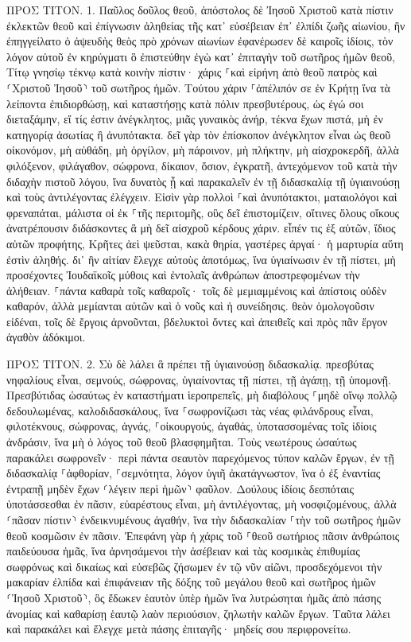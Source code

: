 \documentclass[twoside, 9pt]{extreport}
\begin{document}
ΠΡΟΣ ΤΙΤΟΝ.
1.
Παῦλος δοῦλος θεοῦ, ἀπόστολος δὲ Ἰησοῦ Χριστοῦ κατὰ πίστιν ἐκλεκτῶν θεοῦ καὶ ἐπίγνωσιν ἀληθείας τῆς κατ᾽ εὐσέβειαν 
ἐπ᾽ ἐλπίδι ζωῆς αἰωνίου, ἣν ἐπηγγείλατο ὁ ἀψευδὴς θεὸς πρὸ χρόνων αἰωνίων 
ἐφανέρωσεν δὲ καιροῖς ἰδίοις, τὸν λόγον αὐτοῦ ἐν κηρύγματι ὃ ἐπιστεύθην ἐγὼ κατ᾽ ἐπιταγὴν τοῦ σωτῆρος ἡμῶν θεοῦ, 
Τίτῳ γνησίῳ τέκνῳ κατὰ κοινὴν πίστιν· χάρις ⸀καὶ εἰρήνη ἀπὸ θεοῦ πατρὸς καὶ ⸂Χριστοῦ Ἰησοῦ⸃ τοῦ σωτῆρος ἡμῶν. 
Τούτου χάριν ⸀ἀπέλιπόν σε ἐν Κρήτῃ ἵνα τὰ λείποντα ἐπιδιορθώσῃ, καὶ καταστήσῃς κατὰ πόλιν πρεσβυτέρους, ὡς ἐγώ σοι διεταξάμην, 
εἴ τίς ἐστιν ἀνέγκλητος, μιᾶς γυναικὸς ἀνήρ, τέκνα ἔχων πιστά, μὴ ἐν κατηγορίᾳ ἀσωτίας ἢ ἀνυπότακτα. 
δεῖ γὰρ τὸν ἐπίσκοπον ἀνέγκλητον εἶναι ὡς θεοῦ οἰκονόμον, μὴ αὐθάδη, μὴ ὀργίλον, μὴ πάροινον, μὴ πλήκτην, μὴ αἰσχροκερδῆ, 
ἀλλὰ φιλόξενον, φιλάγαθον, σώφρονα, δίκαιον, ὅσιον, ἐγκρατῆ, 
ἀντεχόμενον τοῦ κατὰ τὴν διδαχὴν πιστοῦ λόγου, ἵνα δυνατὸς ᾖ καὶ παρακαλεῖν ἐν τῇ διδασκαλίᾳ τῇ ὑγιαινούσῃ καὶ τοὺς ἀντιλέγοντας ἐλέγχειν. 
Εἰσὶν γὰρ πολλοὶ ⸀καὶ ἀνυπότακτοι, ματαιολόγοι καὶ φρεναπάται, μάλιστα οἱ ἐκ ⸀τῆς περιτομῆς, 
οὓς δεῖ ἐπιστομίζειν, οἵτινες ὅλους οἴκους ἀνατρέπουσιν διδάσκοντες ἃ μὴ δεῖ αἰσχροῦ κέρδους χάριν. 
εἶπέν τις ἐξ αὐτῶν, ἴδιος αὐτῶν προφήτης, Κρῆτες ἀεὶ ψεῦσται, κακὰ θηρία, γαστέρες ἀργαί· 
ἡ μαρτυρία αὕτη ἐστὶν ἀληθής. δι᾽ ἣν αἰτίαν ἔλεγχε αὐτοὺς ἀποτόμως, ἵνα ὑγιαίνωσιν ἐν τῇ πίστει, 
μὴ προσέχοντες Ἰουδαϊκοῖς μύθοις καὶ ἐντολαῖς ἀνθρώπων ἀποστρεφομένων τὴν ἀλήθειαν. 
⸀πάντα καθαρὰ τοῖς καθαροῖς· τοῖς δὲ μεμιαμμένοις καὶ ἀπίστοις οὐδὲν καθαρόν, ἀλλὰ μεμίανται αὐτῶν καὶ ὁ νοῦς καὶ ἡ συνείδησις. 
θεὸν ὁμολογοῦσιν εἰδέναι, τοῖς δὲ ἔργοις ἀρνοῦνται, βδελυκτοὶ ὄντες καὶ ἀπειθεῖς καὶ πρὸς πᾶν ἔργον ἀγαθὸν ἀδόκιμοι. 

ΠΡΟΣ ΤΙΤΟΝ.
2.
Σὺ δὲ λάλει ἃ πρέπει τῇ ὑγιαινούσῃ διδασκαλίᾳ. 
πρεσβύτας νηφαλίους εἶναι, σεμνούς, σώφρονας, ὑγιαίνοντας τῇ πίστει, τῇ ἀγάπῃ, τῇ ὑπομονῇ. 
Πρεσβύτιδας ὡσαύτως ἐν καταστήματι ἱεροπρεπεῖς, μὴ διαβόλους ⸀μηδὲ οἴνῳ πολλῷ δεδουλωμένας, καλοδιδασκάλους, 
ἵνα ⸀σωφρονίζωσι τὰς νέας φιλάνδρους εἶναι, φιλοτέκνους, 
σώφρονας, ἁγνάς, ⸀οἰκουργούς, ἀγαθάς, ὑποτασσομένας τοῖς ἰδίοις ἀνδράσιν, ἵνα μὴ ὁ λόγος τοῦ θεοῦ βλασφημῆται. 
Τοὺς νεωτέρους ὡσαύτως παρακάλει σωφρονεῖν· 
περὶ πάντα σεαυτὸν παρεχόμενος τύπον καλῶν ἔργων, ἐν τῇ διδασκαλίᾳ ⸀ἀφθορίαν, ⸀σεμνότητα, 
λόγον ὑγιῆ ἀκατάγνωστον, ἵνα ὁ ἐξ ἐναντίας ἐντραπῇ μηδὲν ἔχων ⸂λέγειν περὶ ἡμῶν⸃ φαῦλον. 
Δούλους ἰδίοις δεσπόταις ὑποτάσσεσθαι ἐν πᾶσιν, εὐαρέστους εἶναι, μὴ ἀντιλέγοντας, 
μὴ νοσφιζομένους, ἀλλὰ ⸂πᾶσαν πίστιν⸃ ἐνδεικνυμένους ἀγαθήν, ἵνα τὴν διδασκαλίαν ⸀τὴν τοῦ σωτῆρος ἡμῶν θεοῦ κοσμῶσιν ἐν πᾶσιν. 
Ἐπεφάνη γὰρ ἡ χάρις τοῦ ⸀θεοῦ σωτήριος πᾶσιν ἀνθρώποις 
παιδεύουσα ἡμᾶς, ἵνα ἀρνησάμενοι τὴν ἀσέβειαν καὶ τὰς κοσμικὰς ἐπιθυμίας σωφρόνως καὶ δικαίως καὶ εὐσεβῶς ζήσωμεν ἐν τῷ νῦν αἰῶνι, 
προσδεχόμενοι τὴν μακαρίαν ἐλπίδα καὶ ἐπιφάνειαν τῆς δόξης τοῦ μεγάλου θεοῦ καὶ σωτῆρος ἡμῶν ⸂Ἰησοῦ Χριστοῦ⸃, 
ὃς ἔδωκεν ἑαυτὸν ὑπὲρ ἡμῶν ἵνα λυτρώσηται ἡμᾶς ἀπὸ πάσης ἀνομίας καὶ καθαρίσῃ ἑαυτῷ λαὸν περιούσιον, ζηλωτὴν καλῶν ἔργων. 
Ταῦτα λάλει καὶ παρακάλει καὶ ἔλεγχε μετὰ πάσης ἐπιταγῆς· μηδείς σου περιφρονείτω. 
\end{document}
